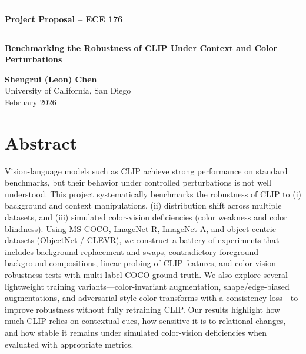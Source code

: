 \documentclass[11pt]{article}
\begin{document}
\begin{center}
\rule{\textwidth}{1pt}

\vspace{0.3cm}

{\LARGE \textbf{Project Proposal -- ECE 176}}  

\vspace{0.3cm}

\rule{\textwidth}{0.8pt}

\vspace{0.8cm}

\textbf{Benchmarking the Robustness of CLIP Under Context and Color Perturbations}

\vspace{0.5cm}

\textbf{Shengrui (Leon) Chen} \\
University of California, San Diego \\
February 2026

\end{center}

\vspace{0.8cm}

\section*{Abstract}

Vision-language models such as CLIP achieve strong performance on standard benchmarks, but their behavior under controlled perturbations is not well understood. This project systematically benchmarks the robustness of CLIP to (i) background and context manipulations, (ii) distribution shift across multiple datasets, and (iii) simulated color-vision deficiencies (color weakness and color blindness). Using MS COCO, ImageNet-R, ImageNet-A, and object-centric datasets (ObjectNet / CLEVR), we construct a battery of experiments that includes background replacement and swaps, contradictory foreground--background compositions, linear probing of CLIP features, and color-vision robustness tests with multi-label COCO ground truth. We also explore several lightweight training variants---color-invariant augmentation, shape/edge-biased augmentations, and adversarial-style color transforms with a consistency loss---to improve robustness without fully retraining CLIP. Our results highlight how much CLIP relies on contextual cues, how sensitive it is to relational changes, and how stable it remains under simulated color-vision deficiencies when evaluated with appropriate metrics.
\end{document}
